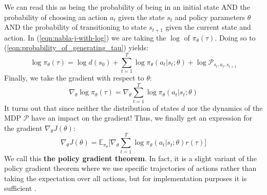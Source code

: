 \documentclass[journal, onecolumn, 12pt, draftclsnofoot]{IEEEtran}
\numberwithin{equation}{section}
\newcommand{\kword}[1]{\textbf{#1}}
\newcommand{\mc}[1]{\mathcal{#1}}
\begin{document}
	We can read this as being the probability of being in an initial state AND the probability of choosing an action $a_t$ given the state $s_t$ and policy parameters $\theta$ AND the probability of transitioning to state $s_{t+1}$ given the current state and action. In (\ref{eqn:nabla-j-with-log}) we are taking the $\log$ of $\pi_\theta (\tau)$. Doing so to (\ref{eqn:probability_of_generating_tau}) yields:
	\begin{equation}
		\label{eqn:log_probablity_of_generating_tau}
		\log \pi_\theta (\tau) = \log d(s_0) + \sum_{t=1}^T \log \pi_\theta (a_t \vert s_t; \theta) + \log \mc{P}_{s_t, a_t, s_{t+1}}
	\end{equation}
	Finally, we take the gradient with respect to $\theta$:
	\begin{equation}
		\label{eqn:nabla_log_probablity_of_generating_tau}
		\nabla_\theta \log \pi_\theta (\tau) = \nabla_\theta \sum_{t=1}^T \log \pi_\theta (a_t \vert s_t; \theta)
	\end{equation}
	It turns out that since neither the distribution of states $d$ nor the dynamics of the MDP $\mc{P}$ have an impact on the gradient! Thus, we finally get an expression for the gradient $\nabla_\theta J(\theta)$:
	\begin{equation}
		\label{eqn:policy_gradient_theorem}
		\nabla_\theta J(\theta) = \mathbb{E}_{\pi_\theta} \bigg[ \nabla_\theta \sum_{t=1}^T \log \pi_\theta (a_t \vert s_t; \theta) r(\tau) \bigg]
	\end{equation}
	We call this \kword{the policy gradient theorem}. In fact, it is a slight variant of the policy gradient theorem where we use specific trajectories of actions rather than taking the expectation over all actions, but for implementation purposes it is sufficient \cite{sutton}.
\end{document}
